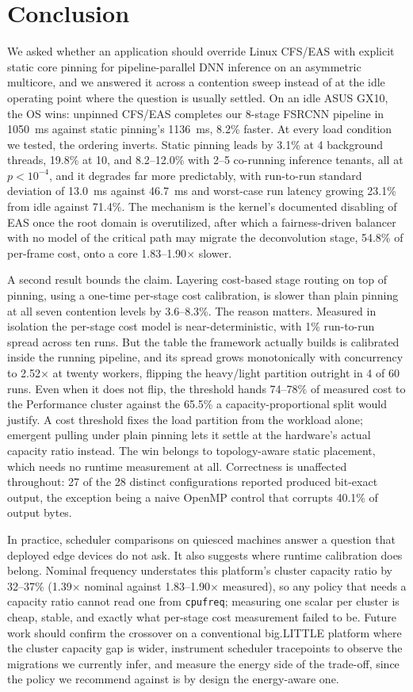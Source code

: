 \documentclass[conference]{IEEEtran}
\begin{document}
\section{Conclusion}
We asked whether an application should override Linux CFS/EAS with explicit static core pinning for pipeline-parallel DNN inference on an asymmetric multicore, and we answered it across a contention sweep instead of at the idle operating point where the question is usually settled. On an idle ASUS GX10, the OS wins: unpinned CFS/EAS completes our 8-stage FSRCNN pipeline in 1050~ms against static pinning's 1136~ms, 8.2\% faster. At every load condition we tested, the ordering inverts. Static pinning leads by 3.1\% at 4 background threads, 19.8\% at 10, and 8.2--12.0\% with 2--5 co-running inference tenants, all at $p<10^{-4}$, and it degrades far more predictably, with run-to-run standard deviation of 13.0~ms against 46.7~ms and worst-case run latency growing 23.1\% from idle against 71.4\%. The mechanism is the kernel's documented disabling of EAS once the root domain is overutilized, after which a fairness-driven balancer with no model of the critical path may migrate the deconvolution stage, 54.8\% of per-frame cost, onto a core 1.83--1.90$\times$ slower.

A second result bounds the claim. Layering cost-based stage routing on top of pinning, using a one-time per-stage cost calibration, is slower than plain pinning at all seven contention levels by 3.6--8.3\%. The reason matters. Measured in isolation the per-stage cost model is near-deterministic, with 1\% run-to-run spread across ten runs. But the table the framework actually builds is calibrated inside the running pipeline, and its spread grows monotonically with concurrency to 2.52$\times$ at twenty workers, flipping the heavy/light partition outright in 4 of 60 runs. Even when it does not flip, the threshold hands 74--78\% of measured cost to the Performance cluster against the 65.5\% a capacity-proportional split would justify. A cost threshold fixes the load partition from the workload alone; emergent pulling under plain pinning lets it settle at the hardware's actual capacity ratio instead. The win belongs to topology-aware static placement, which needs no runtime measurement at all. Correctness is unaffected throughout: 27 of the 28 distinct configurations reported produced bit-exact output, the exception being a naive OpenMP control that corrupts 40.1\% of output bytes.

In practice, scheduler comparisons on quiesced machines answer a question that deployed edge devices do not ask. It also suggests where runtime calibration does belong. Nominal frequency understates this platform's cluster capacity ratio by 32--37\% (1.39$\times$ nominal against 1.83--1.90$\times$ measured), so any policy that needs a capacity ratio cannot read one from \texttt{cpufreq}; measuring one scalar per cluster is cheap, stable, and exactly what per-stage cost measurement failed to be. Future work should confirm the crossover on a conventional big.LITTLE platform where the cluster capacity gap is wider, instrument scheduler tracepoints to observe the migrations we currently infer, and measure the energy side of the trade-off, since the policy we recommend against is by design the energy-aware one.
\end{document}
